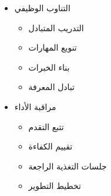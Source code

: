 \begin{itemize}
\begin{itemize}
        \item التناوب الوظيفي
        \begin{itemize}
            \item التدريب المتبادل
            \item تنويع المهارات
            \item بناء الخبرات
            \item تبادل المعرفة
        \end{itemize}
        
        \item مراقبة الأداء
        \begin{itemize}
            \item تتبع التقدم
            \item تقييم الكفاءة
            \item جلسات التغذية الراجعة
            \item تخطيط التطوير
        \end{itemize}
    \end{itemize}
\end{itemize} 
